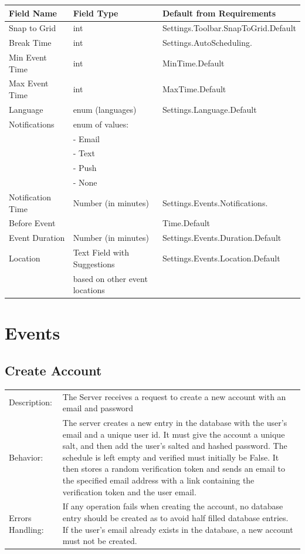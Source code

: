 \documentclass{scrreprt}
\begin{document}
\begin{center}
\begin{longtable}{ | p{3cm} | p{6cm} | p{6cm} | }
\hline
\textbf{Field Name} & \textbf{Field Type} & \textbf{Default from Requirements} \\
\hline
Snap to Grid & int & Settings.Toolbar.SnapToGrid.Default \\
\hline
Break Time & int & Settings.AutoScheduling. \\
\hline
Min Event Time & int & MinTime.Default\\
\hline
Max Event Time & int & MaxTime.Default\\
\hline
Language & enum (languages) & Settings.Language.Default \\
\hline
Notifications &  enum of values: & \\
& - Email &\\
& - Text & \\
& - Push & \\
& - None & \\
\hline
Notification Time & Number (in minutes) & Settings.Events.Notifications. \\
Before Event & & Time.Default \\
\hline
Event Duration & Number (in minutes) & Settings.Events.Duration.Default \\
\hline
Location & Text Field with Suggestions & Settings.Events.Location.Default \\
& based on other event locations & \\
\hline
\end{longtable}
\end{center}

\section{Events}
\subsection{Create Account}
\begin{center}
\begin{tabular}{ p{2cm} p{13cm} }
Description: & The Server receives a request to create a new account with an email and password\\
Behavior: & The server creates a new entry in the database with the user's email and a unique user id.  It must give the
account a unique salt, and then add the user's salted and hashed password.  The schedule is left empty and
verified must initially be False.  It then stores a random verification token and sends an email to the specified
email address with a link containing the verification token and the user email.\\
Errors Handling: & If any operation fails when creating the account, no database entry should be created as to avoid half
filled database entries.  If the user's email already exists in the database, a new account must not be created.
\end{tabular}
\end{center}
\end{document}
